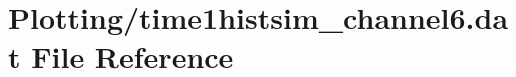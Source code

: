 \hypertarget{Plotting_2time1histsim__channel6_8dat}{}\section{Plotting/time1histsim\+\_\+channel6.dat File Reference}
\label{Plotting_2time1histsim__channel6_8dat}
